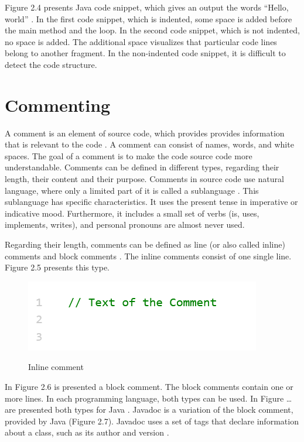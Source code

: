 Figure 2.4 presents Java code snippet, which gives an output the words “Hello, world”  \cite{hanenberg2024indentation}.
In the first code snippet, which is indented, some space is added before the main method and the loop.  In the second code snippet, which is not indented, no space is added. The additional space visualizes that particular code lines belong to another fragment. In the non-indented code snippet, it is difficult to detect the code structure. 
 





\section{Commenting}
A comment is an element of source code, which provides provides information that is relevant to the code \cite{de2011comment}. A comment can consist of names, words, and white spaces.  The goal of a comment is to make the code source code more understandable.  Comments can be defined in different types, regarding their length, their content and their purpose. Comments in source code use natural language, where only a limited part of it is called a sublanguage \cite{de2017investigating}. This sublanguage has specific characteristics. It uses the present tense in imperative or indicative mood. Furthermore, it includes a small set of verbs (is, uses, implements, writes), and personal pronouns are almost never used.

Regarding their length, comments can be defined as line (or also called inline) comments and block comments \cite{de2017investigating}. The inline comments consist of one single line. Figure 2.5 presents this type. 

\begin{figure} [H]
  \centering
  \includegraphics [scale=1]
  {figures/inline.png}
  \caption{Inline comment }
  \cite{de2011comment}
  \label{fig:AnhangsChor}
\end{figure}

In Figure 2.6 is presented a block comment. The block comments contain one or more lines. In each programming language, both types can be used. In Figure … are presented both types for Java \cite{de2011comment}. Javadoc is a variation of the block comment, provided by Java (Figure 2.7).  Javadoc uses a set of tags that declare information about a class, such as its author and version \cite{de2011comment}.

